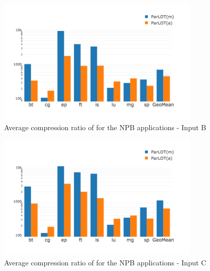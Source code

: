 




\begin{figure}[t]
\centering
\includegraphics[width=3.8in]{figs.comet.newMed/comet_chartAvg_cr_B_p3_5.png}
\caption{ Average compression ratio of \parlot for the NPB applications - Input B}
\label{comet_chartAvg_cr_B_p3_5}
\end{figure}

\begin{figure}[t]
\centering
\includegraphics[width=3.8in]{figs.comet.newMed/comet_chartAvg_cr_C_p3_5.png}
\caption{ Average compression ratio of \parlot for the NPB applications - Input C}
\label{comet_chartAvg_cr_C_p3_5}
\end{figure}







